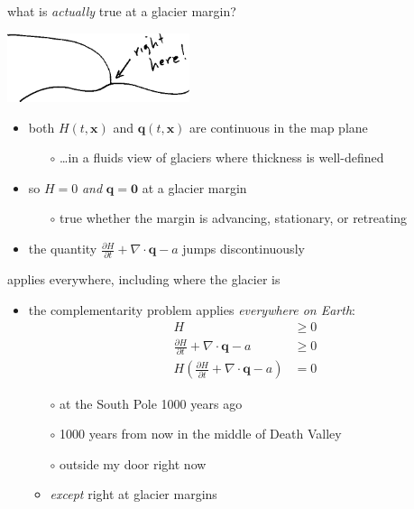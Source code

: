 \documentclass[10pt,hyperref,dvipsnames]{beamer}
\newcommand{\bq}{\mathbf{q}}
\newcommand{\bx}{\mathbf{x}}
\newcommand{\bzero}{\bm{0}}
\newcommand{\Div}{\nabla\cdot}
\begin{document}
\begin{frame}{what is \emph{actually} true at a glacier margin?}

\begin{center}
\includegraphics[width=0.4\textwidth]{figs/margin.png}
\end{center}

\begin{itemize}
\item \alert{both $H(t,\bx)$ and $\bq(t,\bx)$ are continuous in the map plane}
    \begin{itemize}
    \item[$\circ$] \dots in a fluids view of glaciers where thickness is well-defined
    \end{itemize}
\item so $H=0$ \emph{and} $\bq=\bzero$ at a glacier margin
    \begin{itemize}
    \item[$\circ$] true whether the margin is advancing, stationary, or retreating
    \end{itemize}
\item the quantity \quad $\frac{\partial H}{\partial t} + \Div \bq - a$ \quad jumps discontinuously
\end{itemize}
\end{frame}


\begin{frame}{applies everywhere, including where the glacier is}
\begin{itemize}
\item the complementarity problem applies \emph{everywhere on Earth}:
\begin{align*}
H &\ge 0 \\
\frac{\partial H}{\partial t} + \Div \bq - a &\ge 0 \\
H \left(\frac{\partial H}{\partial t} + \Div \bq - a\right) &= 0
\end{align*}
    \begin{itemize}
    \item[$\circ$] at the South Pole 1000 years ago
    \item[$\circ$] 1000 years from now in the middle of Death Valley
    \item[$\circ$] outside my door right now

    \medskip
    \item<2>[$\circ$] \emph{except} right at glacier margins
    \end{itemize}
\end{itemize}
\end{frame}
\end{document}

